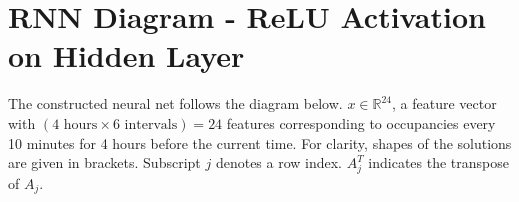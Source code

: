 \documentclass[landscape]{report}
\begin{document}
\thispagestyle{empty}



\section*{RNN Diagram - ReLU Activation on Hidden Layer}

The constructed neural net follows the diagram below. $x \in \mathbb{R}^{24}$, a feature vector with $(4\text{ hours} \times 6\text{ intervals}) =24 $ features corresponding to occupancies every 10 minutes for 4 hours before the current time. For clarity, shapes of the solutions are given in brackets. Subscript $j$ denotes a row index. $A^T_j$ indicates the transpose of $A_j$. 
\end{document}
